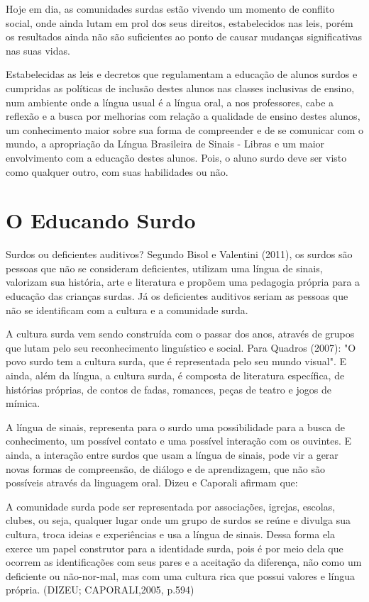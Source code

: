 \documentclass[brasil]{abnt}
\begin{document}
	Hoje em dia, as comunidades surdas estão vivendo um momento de conflito social, onde ainda lutam em prol dos seus direitos, estabelecidos nas leis, porém os resultados ainda não são suficientes ao 
	ponto de causar mudanças significativas nas suas vidas. 
		
	Estabelecidas as leis e decretos que regulamentam a educação de alunos surdos e cumpridas as políticas de inclusão destes alunos nas classes inclusivas de ensino, num ambiente onde a língua usual 
	é a língua oral, a nos professores, cabe a reflexão e a busca por melhorias com relação a qualidade de ensino destes alunos, um conhecimento maior sobre sua forma de compreender e de se comunicar
	com o mundo, a apropriação da Língua Brasileira de Sinais - Libras e um maior envolvimento com a educação destes alunos. Pois, o aluno surdo deve ser visto como qualquer outro, com suas habilidades
	ou não. 			     
	

\chapter{O Educando Surdo}
		Surdos ou deficientes auditivos? Segundo Bisol e Valentini (2011), os surdos são pessoas que não se consideram deficientes, utilizam uma língua de sinais, valorizam sua história, arte e literatura 
		e propõem uma pedagogia própria para a educação das crianças surdas. Já os deficientes auditivos seriam as pessoas que não se identificam com a cultura e a comunidade surda. 
				
		A cultura surda vem sendo construída com o passar dos anos, através de grupos que lutam pelo seu reconhecimento linguístico e social. 
		Para Quadros (2007): "O povo surdo tem a cultura surda, que é representada pelo seu mundo visual". E ainda, além da língua, a cultura surda, é composta de literatura 
		específica, de histórias próprias, de contos de fadas, romances, peças de teatro e jogos de mímica.
		
		A língua de sinais, representa para o surdo uma possibilidade para a busca de conhecimento, um possível contato e uma possível interação com os ouvintes.
		E ainda, a interação entre surdos que usam a língua de sinais, pode vir a gerar novas formas de compreensão, de diálogo e de aprendizagem, que não são possíveis através da linguagem oral.
		Dizeu e Caporali afirmam que:
		
			\begin{citacao}A comunidade surda pode ser representada por associações, igrejas, escolas, clubes, ou seja, qualquer lugar onde um grupo de surdos se reúne e divulga sua cultura, troca ideias e 
							experiências e usa a língua de sinais. Dessa forma ela exerce um papel construtor para a identidade surda, pois é por meio dela que ocorrem as identificações com seus pares e a 
							aceitação da diferença, não como um deficiente ou não-nor-mal, mas com uma cultura rica que possui valores e língua própria. (DIZEU; CAPORALI,2005, p.594)
			\end{citacao}
			
\end{document}
